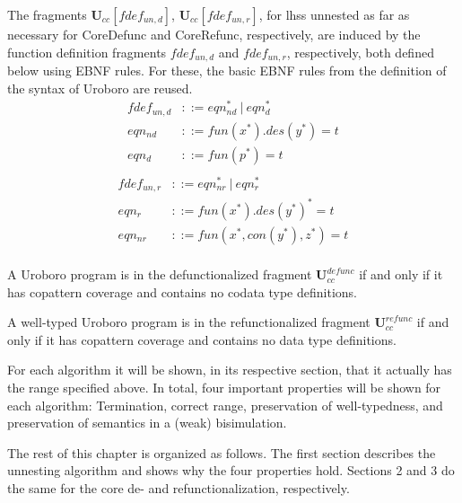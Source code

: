 \begin{definition}
The fragments $\mathbf{U}_{cc}[fdef_{un,d}]$, $\mathbf{U}_{cc}[fdef_{un,r}]$, for lhss unnested as far as necessary for \textsf{CoreDefunc} and \textsf{CoreRefunc}, respectively, are induced by the function definition fragments $fdef_{un,d}$ and $fdef_{un,r}$, respectively, both defined below using EBNF rules. For these, the basic EBNF rules from the definition of the syntax of Uroboro are reused.
\begin{align*}
fdef_{un,d} &::= eqn_{nd}^* ~ | ~ eqn_d^* \\
eqn_{nd} &::= fun(x^*).des(y^*) = t \\
eqn_d &::= fun(p^*) = t \\
\end{align*}
\begin{align*}
fdef_{un,r} &::= eqn_{nr}^* ~ | ~ eqn_r^* \\
eqn_r &::= fun(x^*).des(y^*)^* = t \\
eqn_{nr} &::= fun(x^*, con(y^*), z^*) = t \\
\end{align*}
\end{definition}

\begin{definition}
A Uroboro program is in the defunctionalized fragment $\mathbf{U}^{defunc}_{cc}$ if and only if it has copattern coverage and contains no codata type definitions.
\end{definition}

\begin{definition}
A well-typed Uroboro program is in the refunctionalized fragment $\mathbf{U}^{refunc}_{cc}$ if and only if it has copattern coverage and contains no data type definitions.
\end{definition}

For each algorithm it will be shown, in its respective section, that it actually has the range specified above. In total, four important properties will be shown for each algorithm: Termination, correct range, preservation of well-typedness, and preservation of semantics in a (weak) bisimulation.

The rest of this chapter is organized as follows. The first section describes the unnesting algorithm and shows why the four properties hold. Sections 2 and 3 do the same for the core de- and refunctionalization, respectively.

